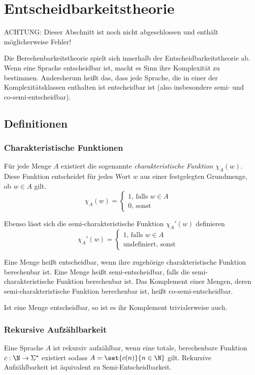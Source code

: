 \chapter{Entscheidbarkeitstheorie}
{\color{red}ACHTUNG: Dieser Abschnitt ist noch nicht abgeschlossen und enthält möglicherweise Fehler!}

Die Berechenbarkeitstheorie spielt sich innerhalb der Entscheidbarkeitstheorie ab. Wenn eine Sprache entscheidbar ist, macht es Sinn ihre Komplexität zu bestimmen. Andersherum heißt das, dass jede Sprache, die in einer der Komplexitätsklassen enthalten ist entscheidbar ist (also insbesondere semi- und co-semi-entscheidbar).

\section{Definitionen}
\subsection{Charakteristische Funktionen}
Für jede Menge $A$ existiert die sogenannte \emph{charakteristische Funktion} $\chi_A(w)$. Diese Funktion entscheidet für jedes Wort $w$ aus einer festgelegten Grundmenge, ob $w\in A$ gilt.
\begin{equation*}
	\chi_A(w)=\begin{cases}
		1\text{, falls } w\in A\\
		0\text{, sonst}
	\end{cases}
\end{equation*}

Ebenso lässt sich die semi-charakteristische Funktion $\chi_A'(w)$ definieren
\begin{equation*}
	\chi_A'(w)=\begin{cases}
		1\text{, falls } w\in A\\
		\mathrm{undefiniert}\text{, sonst}
	\end{cases}
\end{equation*}

Eine Menge heißt entscheidbar, wenn ihre zugehörige charakteristische Funktion berechenbar ist. Eine Menge heißt semi-entscheidbar, falls die semi-charakteristische Funktion berechenbar ist. Das Komplement einer Mengen, deren semi-charakteristische Funktion berechenbar ist, heißt co-semi-entscheidbar.

Ist eine Menge entscheidbar, so ist es ihr Komplement trivialerweise auch.

\subsection{Rekursive Aufzählbarkeit}
Eine Sprache $A$ ist rekursiv aufzählbar, wenn eine totale, berechenbare Funktion $c:\N\rightarrow\Sigma^\star$ existiert sodass $A=\set{c(n)}{n\in\N}$ gilt. Rekursive Aufzählbarkeit ist äquivalent zu Semi-Entscheidbarkeit.

